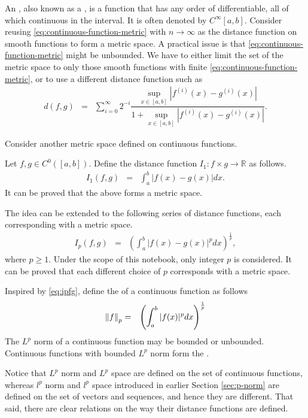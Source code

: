 An , also known as a , is a function that has any order of differentiable, all of which continuous in the interval. It is often denoted by $C^\infty[a,b]$. Consider reusing \eqref{eq:continuous-function-metric} with $n\rightarrow\infty$ as the distance function on smooth functions to form a metric space. A practical issue is that \eqref{eq:continuous-function-metric} might be unbounded. We have to either limit the set of the metric space to only those smooth functions with finite \eqref{eq:continuous-function-metric}, or to use a different distance function such as 
\begin{eqnarray}
	d(f,g) &=& \sum_{i=0}^\infty 2^{-i}\dfrac{\sup_{x\in[a,b]} |f^{(i)}(x)-g^{(i)}(x)|}{1+\sup_{x\in[a,b]} |f^{(i)}(x)-g^{(i)}(x)|}. \nonumber
\end{eqnarray}

Consider another metric space defined on continuous functions. 

Let $f,g \in C^0\left([a,b]\right)$. Define the distance function $I_1:f \times g \to \mathbb{R}$ as follows.
\begin{eqnarray}
	I_1(f, g) &=& \int_{a}^{b} |f(x)-g(x)|dx. \nonumber
\end{eqnarray}
It can be proved that the above forms a metric space.

The idea can be extended to the following series of distance functions, each corresponding with a metric space.
\begin{eqnarray}
	I_p(f, g) &=& \left(\int_{a}^{b} |f(x)-g(x)|^pdx\right)^{\frac{1}{p}}, \label{eq:ipfg}
\end{eqnarray}
where $p\geq 1$. Under the scope of this notebook, only integer $p$ is considered. It can be proved that each different choice of $p$ corresponds with a metric space.

Inspired by \eqref{eq:ipfg}, define the  of a continuous function as follows
\begin{eqnarray}
	\left\lVert f\right\rVert_p &=& \left(\int_{a}^{b}|f(x)|^pdx\right)^{\frac{1}{p}} \nonumber
\end{eqnarray}
The $L^p$ norm of a continuous function may be bounded or unbounded. Continuous functions with bounded $L^p$ norm form the . 

Notice that $L^p$ norm and $L^p$ space are defined on the set of continuous functions, whereas $l^p$ norm and $l^p$ space introduced in earlier Section \ref{sec:p-norm} are defined on the set of vectors and sequences, and hence they are different. That said, there are clear relations on the way their distance functions are defined.






















